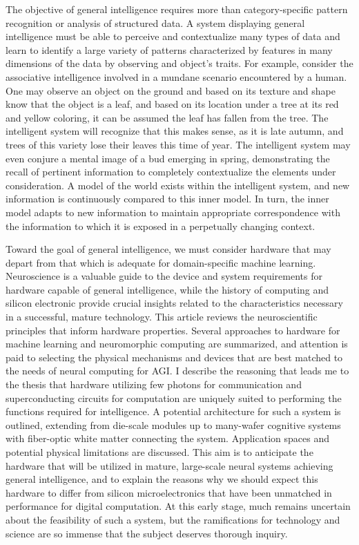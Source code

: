 The objective of general intelligence requires more than category-specific pattern recognition or analysis of structured data. A system displaying general intelligence must be able to perceive and contextualize many types of data and learn to identify a large variety of patterns characterized by features in many dimensions of the data by observing and object's traits. For example, consider the associative intelligence involved in a mundane scenario encountered by a human. One may observe an object on the ground and based on its texture and shape know that the object is a leaf, and based on its location under a tree at its red and yellow coloring, it can be assumed the leaf has fallen from the tree. The intelligent system will recognize that this makes sense, as it is late autumn, and trees of this variety lose their leaves this time of year. The intelligent system may even conjure a mental image of a bud emerging in spring, demonstrating the recall of pertinent information to completely contextualize the elements under consideration. A model of the world exists within the intelligent system, and new information is continuously compared to this inner model. In turn, the inner model adapts to new information to maintain appropriate correspondence with the information to which it is exposed in a perpetually changing context.

Toward the goal of general intelligence, we must consider hardware that may depart from that which is adequate for domain-specific machine learning. Neuroscience is a valuable guide to the device and system requirements for hardware capable of general intelligence, while the history of computing and silicon electronic provide crucial insights related to the characteristics necessary in a successful, mature technology. This article reviews the neuroscientific principles that inform hardware properties. Several approaches to hardware for machine learning and neuromorphic computing are summarized, and attention is paid to selecting the physical mechanisms and devices that are best matched to the needs of neural computing for AGI. I describe the reasoning that leads me to the thesis that hardware utilizing few photons for communication and superconducting circuits for computation are uniquely suited to performing the functions required for intelligence. A potential architecture for such a system is outlined, extending from die-scale modules up to many-wafer cognitive systems with fiber-optic white matter connecting the system. Application spaces and potential physical limitations are discussed. This aim is to anticipate the hardware that will be utilized in mature, large-scale neural systems achieving general intelligence, and to explain the reasons why we should expect this hardware to differ from silicon microelectronics that have been unmatched in performance for digital computation. At this early stage, much remains uncertain about the feasibility of such a system, but the ramifications for technology and science are so immense that the subject deserves thorough inquiry.